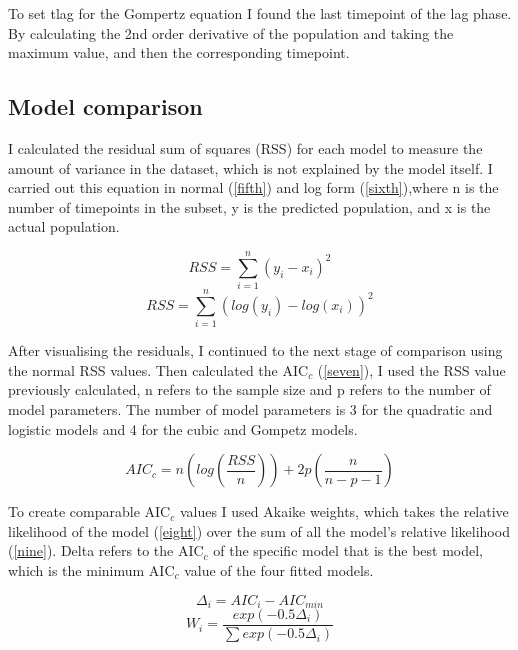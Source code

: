 \documentclass[11pt]{article}
\begin{document}
To set t\textunderscore lag for the Gompertz equation I found the last timepoint of the lag phase. By calculating the 2nd order derivative of the population and taking the maximum value, and then the corresponding timepoint. 

\subsection{Model comparison}

I calculated the residual sum of squares (RSS) for each model to measure the amount of variance in the dataset, which is not explained by the model itself. I carried out this equation in normal (\ref{fifth}) and log form (\ref{sixth}),where n is the number of timepoints in the subset, y is the predicted population, and x is the actual population. 

\begin{equation}\label{fifth}
   RSS = \sum_{i=1}^{n}  (y_i - x_i)^2
\end{equation}
\begin{equation}\label{sixth}
 RSS = \sum_{i=1}^{n}  (log(y_i) - log(x_i))^2
\end{equation}

After visualising the residuals, I continued to the next stage of comparison using the normal RSS values. Then calculated the AIC$_c$ (\ref{seven}), I used the RSS value previously calculated, n refers to the sample size and p refers to the number of model parameters. The number of model parameters is 3 for the quadratic and logistic models and 4 for the cubic and Gompetz models. 

\begin{equation}\label{seven}
   AIC_c = n (log(\frac{RSS}{n})) + 2p(\frac{n}{n-p-1})
\end{equation}

To create comparable AIC$_c$ values I used Akaike weights, which takes the relative likelihood of the model (\ref{eight}) over the sum of all the model's relative likelihood (\ref{nine}). Delta refers to the AIC$_c$ of the specific model that is the best model, which is the minimum AIC$_c$ value of the four fitted models. 

\begin{equation}\label{eight}
\Delta_i = AIC_i - AIC_{min}
\end{equation}
\begin{equation}\label{nine}
W_i= \frac{exp(-0.5\Delta_i)}{\sum exp(-0.5\Delta_i)}
\end{equation}
\end{document}
